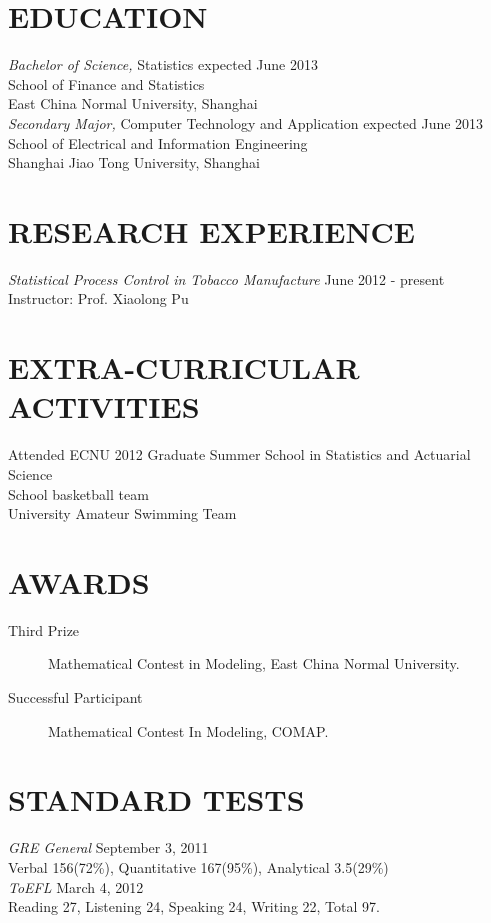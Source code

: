 \documentclass[margin]{res}
\begin{document}
\begin{resume}
\section{EDUCATION} {\sl Bachelor of Science,} Statistics  \hfill      expected June 2013 \\
                School of Finance and Statistics\\
                East China Normal University, Shanghai\\                        
                {\sl Secondary Major,} Computer Technology and Application \hfill   expected June 2013 \\
                School of Electrical and Information Engineering \\
                Shanghai Jiao Tong University, Shanghai\\


\section{RESEARCH EXPERIENCE} {\sl Statistical Process Control in Tobacco Manufacture} \hfill June 2012 - present \\
Instructor: Prof. Xiaolong Pu \\


\section{EXTRA-CURRICULAR \\ ACTIVITIES}             
            Attended ECNU 2012 Graduate Summer School in Statistics and Actuarial Science\\
            School basketball team \\
            University Amateur Swimming Team 
 
\section{AWARDS}
\begin{description}
  \item[Third Prize] Mathematical Contest in Modeling, East China Normal University.
  \item[Successful Participant] Mathematical Contest In Modeling, COMAP.
\end{description} 
 

\section{STANDARD TESTS} {\sl GRE General} \hfill September 3, 2011 \\
                Verbal 156(72\%), Quantitative 167(95\%), Analytical 3.5(29\%) \\  
                {\sl ToEFL}  \hfill March 4, 2012 \\
                Reading 27, Listening 24, Speaking 24, Writing 22, Total 97. \\  
 

\end{resume}
\end{document}
